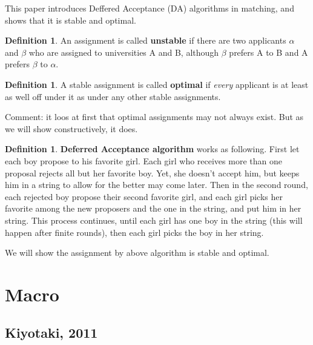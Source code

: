 \documentclass{book}
\theoremstyle{plain}
\theoremstyle{definition}
\newtheorem{defn}[thm]{Definition} %
\begin{document}
This paper introduces Deffered Acceptance (DA) algorithms in matching, and shows that it is stable and optimal.

\begin{defn}
An assignment is called \textbf{unstable} if there are two applicants $\alpha$ and $\beta$ who are assigned to universities A and B, although $\beta$ prefers A to B and A prefers $\beta$ to $\alpha$.
\end{defn}

\begin{defn}
A stable assignment is called \textbf{optimal} if \textit{every} applicant is at least as well off under it as under any other stable assignments.
\end{defn}

Comment: it loos at first that optimal assignments may not always exist. But as we will show constructively, it does.

\begin{defn}
\textbf{Deferred Acceptance algorithm} works as following. First let each boy propose to his favorite girl. Each girl who receives more than one proposal rejects all but her favorite boy. Yet, she doesn't accept him, but keeps him in a string to allow for the better may come later. Then in the second round, each rejected boy propose their second favorite girl, and each girl picks her favorite among the new proposers and the one in the string, and put him in her string. This process continues, until each girl has one boy in the string (this will happen after finite rounds), then each girl picks the boy in her string.
\end{defn}

We will show the assignment by above algorithm is stable and optimal.









\chapter{Macro} %
\label{cha:chapter_name}

\section{Kiyotaki, 2011} %
\label{sec:kiyotaki_2011}

\textbf{}
\end{document}
